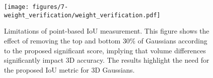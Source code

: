 \begin{figure}[t!]
    \centering
    \texttt{[image: figures/7-weight\_verification/weight\_verification.pdf]}
    \vspace{-6mm}
    \caption{
        Limitations of point-based IoU measurement.
        This figure shows the effect of removing the top and bottom 30\% of Gaussians according to the proposed significant score, implying 
        that volume differences significantly impact 3D accuracy. The results highlight the need for the proposed IoU metric for 3D Gaussians.
    }
    \label{fig:significant_score}
    \vspace{-5mm}
\end{figure}